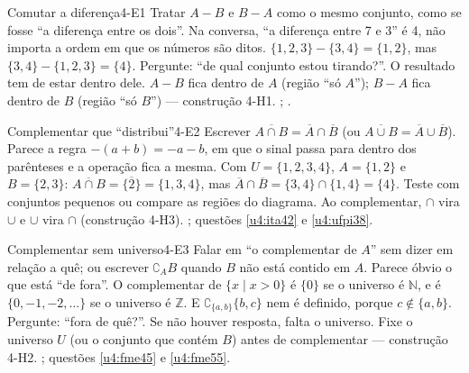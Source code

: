 \ErrosComuns

\begin{erro}{Comutar a diferença}{4-E1}
 Tratar $A-B$ e $B-A$ como o mesmo conjunto, como se fosse \enquote{a diferença entre os dois}.
 Na conversa, \enquote{a diferença entre 7 e 3} é 4, não importa a ordem em que os números são ditos.
 $\{1,2,3\}-\{3,4\}=\{1,2\}$, mas $\{3,4\}-\{1,2,3\}=\{4\}$.
 Pergunte: \enquote{de qual conjunto estou tirando?}. O resultado tem de estar dentro dele.
 $A-B$ fica dentro de $A$ (região \enquote{só $A$}); $B-A$ fica dentro de $B$ (região \enquote{só $B$}) — construção 4-H1.
 ; .
\end{erro}

\begin{erro}{Complementar que \enquote{distribui}}{4-E2}
 Escrever $\overline{A\cap B}=\overline{A}\cap\overline{B}$ (ou $\overline{A\cup B}=\overline{A}\cup\overline{B}$).
 Parece a regra $-(a+b)=-a-b$, em que o sinal passa para dentro dos parênteses e a operação fica a mesma.
 Com $U=\{1,2,3,4\}$, $A=\{1,2\}$ e $B=\{2,3\}$: $\overline{A\cap B}=\overline{\{2\}}=\{1,3,4\}$, mas $\overline{A}\cap\overline{B}=\{3,4\}\cap\{1,4\}=\{4\}$.
 Teste com conjuntos pequenos ou compare as regiões do diagrama.
 Ao complementar, $\cap$ vira $\cup$ e $\cup$ vira $\cap$ (construção 4-H3).
 ; questões \ref{u4:ita42} e \ref{u4:ufpi38}.
\end{erro}

\begin{erro}{Complementar sem universo}{4-E3}
 Falar em \enquote{o complementar de $A$} sem dizer em relação a quê; ou escrever $\complement_A B$ quando $B$ não está contido em $A$.
 Parece óbvio o que está \enquote{de fora}.
 O complementar de $\{x\mid x>0\}$ é $\{0\}$ se o universo é $\mathbb{N}$, e é $\{0,-1,-2,\ldots\}$ se o universo é $\mathbb{Z}$. E $\complement_{\{a,b\}}\{b,c\}$ nem é definido, porque $c\notin\{a,b\}$.
 Pergunte: \enquote{fora de quê?}. Se não houver resposta, falta o universo.
 Fixe o universo $U$ (ou o conjunto que contém $B$) antes de complementar — construção 4-H2.
 ; questões \ref{u4:fme45} e \ref{u4:fme55}.
\end{erro}

